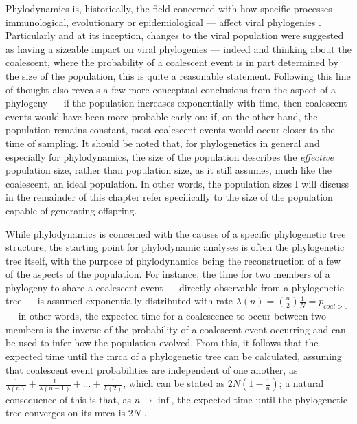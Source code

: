 Phylodynamics is, historically, the field concerned with how specific processes --- immunological, evolutionary or epidemiological --- affect viral phylogenies \cite{Volz2013-ey}. Particularly and at its inception, changes to the viral population were suggested as having a sizeable impact on viral phylogenies \cite{Grenfell2004-ip} --- indeed and thinking about the coalescent, where the probability of a coalescent event is in part determined by the size of the population, this is quite a reasonable statement. Following this line of thought also reveals a few more conceptual conclusions from the aspect of a phylogeny --- if the population increases exponentially with time, then coalescent events would have been more probable early on; if, on the other hand, the population remains constant, most coalescent events would occur closer to the time of sampling. It should be noted that, for phylogenetics in general and especially for phylodynamics, the size of the population describes the \textit{effective} population size, rather than population size, as it still assumes, much like the coalescent, an ideal population. In other words, the population sizes I will discuss in the remainder of this chapter refer specifically to the size of the population capable of generating offspring.

While phylodynamics is concerned with the causes of a specific phylogenetic tree structure, the starting point for phylodynamic analyses is often the phylogenetic tree itself, with the purpose of phylodynamics being the reconstruction of a few of the aspects of the population. For instance, the time for two members of a phylogeny to share a coalescent event --- directly observable from a phylogenetic tree --- is assumed exponentially distributed with rate $\lambda(n) = \binom{n}{2}\frac{1}{N} = p_{coal>0}$ --- in other words, the expected time for a coalescence to occur between two members is the inverse of the probability of a coalescent event occurring and can be used to infer how the population evolved. From this, it follows that the expected time until the \ac{mrca} of a phylogenetic tree can be calculated, assuming that coalescent event probabilities are independent of one another, as $\frac{1}{\lambda(n)} + \frac{1}{\lambda(n-1)} + ... + \frac{1}{\lambda(2)}$, which can be stated as $2N(1-\frac{1}{n})$; a natural consequence of this is that, as $n \rightarrow \inf$, the expected time until the phylogenetic tree converges on its \ac{mrca} is $2N$ \cite{Volz2013-ey}. 

